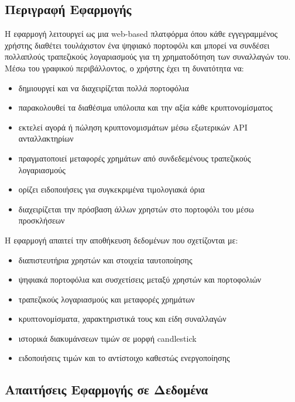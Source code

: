\documentclass[a4paper,12pt]{article}
\begin{document}
\subsection{Περιγραφή Εφαρμογής}
Η εφαρμογή λειτουργεί ως μια web-based πλατφόρμα όπου κάθε εγγεγραμμένος χρήστης διαθέτει
τουλάχιστον ένα ψηφιακό πορτοφόλι και μπορεί να συνδέσει πολλαπλούς τραπεζικούς λογαριασμούς για
τη χρηματοδότηση των συναλλαγών του. Μέσω του γραφικού περιβάλλοντος, ο χρήστης έχει τη
δυνατότητα να:

\begin{itemize}
    \item δημιουργεί και να διαχειρίζεται πολλά πορτοφόλια
    \item παρακολουθεί τα διαθέσιμα υπόλοιπα και την αξία κάθε κρυπτονομίσματος
    \item εκτελεί αγορά ή πώληση κρυπτονομισμάτων μέσω εξωτερικών API ανταλλακτηρίων
    \item πραγματοποιεί μεταφορές χρημάτων από συνδεδεμένους τραπεζικούς λογαριασμούς
    \item ορίζει ειδοποιήσεις για συγκεκριμένα τιμολογιακά όρια
    \item διαχειρίζεται την πρόσβαση άλλων χρηστών στο πορτοφόλι του μέσω προσκλήσεων
\end{itemize}

Η εφαρμογή απαιτεί την αποθήκευση δεδομένων που σχετίζονται με:

\begin{itemize}
    \item διαπιστευτήρια χρηστών και στοιχεία ταυτοποίησης
    \item ψηφιακά πορτοφόλια και συσχετίσεις μεταξύ χρηστών και πορτοφολιών
    \item τραπεζικούς λογαριασμούς και μεταφορές χρημάτων
    \item κρυπτονομίσματα, χαρακτηριστικά τους και είδη συναλλαγών
    \item ιστορικά διακυμάνσεων τιμών σε μορφή candlestick
    \item ειδοποιήσεις τιμών και το αντίστοιχο καθεστώς ενεργοποίησης
\end{itemize}

\subsection{Απαιτήσεις Εφαρμογής σε Δεδομένα}
\end{document}
